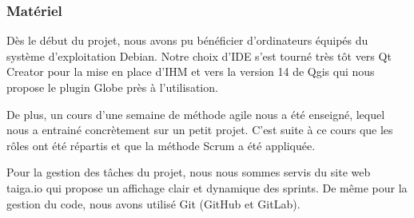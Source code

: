 \subsubsection{Matériel}
Dès le début du projet, nous avons pu bénéficier d'ordinateurs équipés du système d'exploitation Debian. Notre choix d'IDE s'est tourné très tôt vers Qt Creator pour la mise en place d'IHM et vers la version 14 de Qgis qui nous propose le plugin Globe près à l'utilisation.

De plus, un cours d'une semaine de méthode agile nous a été enseigné, lequel nous a entrainé concrètement sur un petit projet. C'est suite à ce cours que les rôles ont été répartis et que la méthode Scrum a été appliquée.

Pour la gestion des tâches du projet, nous nous sommes servis du site web taiga.io qui propose un affichage clair et dynamique des sprints. De même pour la gestion du code, nous avons utilisé Git (GitHub et GitLab).
